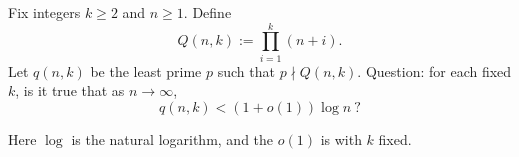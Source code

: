 Fix integers $k\ge 2$ and $n\ge 1$. Define
\[
Q(n,k):=\prod_{i=1}^k (n+i).
\]
Let $q(n,k)$ be the least prime $p$ such that $p\nmid Q(n,k)$.
Question: for each fixed $k$, is it true that as $n\to\infty$,
\[
q(n,k) < (1+o(1))\log n\ ?
\]

Here $\log$ is the natural logarithm, and the $o(1)$ is with $k$ fixed.
